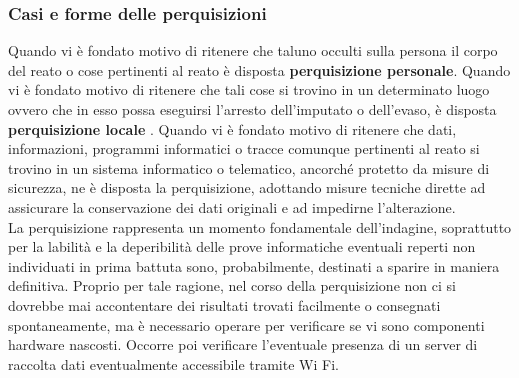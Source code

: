 \subsubsection{Casi e forme delle perquisizioni}
Quando vi è fondato motivo di ritenere che taluno occulti sulla persona il corpo del reato o cose pertinenti al reato  è disposta \textbf{perquisizione personale}. Quando vi è fondato motivo di ritenere che tali cose si trovino in un determinato luogo  ovvero che in esso possa eseguirsi l'arresto dell'imputato o dell'evaso, è disposta \textbf{perquisizione locale }. Quando vi è fondato motivo di ritenere che dati, informazioni, programmi
informatici o tracce comunque pertinenti al reato si trovino in un sistema informatico o telematico, ancorché protetto da misure di sicurezza, ne è disposta la perquisizione, adottando misure tecniche dirette ad assicurare la conservazione dei dati originali e ad impedirne l'alterazione.
\\
La perquisizione rappresenta un momento fondamentale dell'indagine, soprattutto per la labilità e la deperibilità delle prove informatiche eventuali reperti non individuati in prima battuta sono, probabilmente, destinati a sparire in maniera definitiva. Proprio per tale ragione, nel corso della perquisizione non ci si dovrebbe mai accontentare dei risultati trovati facilmente o consegnati spontaneamente, ma è necessario operare per verificare se vi sono componenti hardware nascosti. Occorre poi verificare l'eventuale presenza di un server di raccolta dati eventualmente accessibile tramite Wi Fi. 
